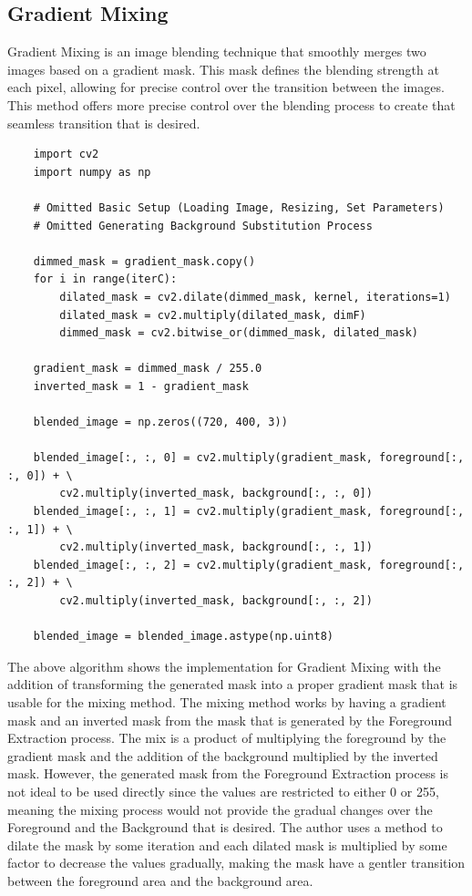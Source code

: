 \documentclass{article}
\begin{document}
\subsection{Gradient Mixing}

Gradient Mixing is an image blending technique that smoothly merges two images based on a gradient mask. This mask defines the blending strength at each pixel, allowing for precise control over the transition between the images. This method offers more precise control over the blending process to create that seamless transition that is desired.

\begin{verbatim}
    import cv2
    import numpy as np

    # Omitted Basic Setup (Loading Image, Resizing, Set Parameters)
    # Omitted Generating Background Substitution Process

    dimmed_mask = gradient_mask.copy()
    for i in range(iterC):
        dilated_mask = cv2.dilate(dimmed_mask, kernel, iterations=1)
        dilated_mask = cv2.multiply(dilated_mask, dimF)
        dimmed_mask = cv2.bitwise_or(dimmed_mask, dilated_mask)

    gradient_mask = dimmed_mask / 255.0
    inverted_mask = 1 - gradient_mask

    blended_image = np.zeros((720, 400, 3))

    blended_image[:, :, 0] = cv2.multiply(gradient_mask, foreground[:, :, 0]) + \
        cv2.multiply(inverted_mask, background[:, :, 0])
    blended_image[:, :, 1] = cv2.multiply(gradient_mask, foreground[:, :, 1]) + \
        cv2.multiply(inverted_mask, background[:, :, 1])
    blended_image[:, :, 2] = cv2.multiply(gradient_mask, foreground[:, :, 2]) + \
        cv2.multiply(inverted_mask, background[:, :, 2])

    blended_image = blended_image.astype(np.uint8)

\end{verbatim}

The above algorithm shows the implementation for Gradient Mixing with the addition of transforming the generated mask into a proper gradient mask that is usable for the mixing method. The mixing method works by having a gradient mask and an inverted mask from the mask that is generated by the Foreground Extraction process. The mix is a product of multiplying the foreground by the gradient mask and the addition of the background multiplied by the inverted mask. However, the generated mask from the Foreground Extraction process is not ideal to be used directly since the values are restricted to either 0 or 255, meaning the mixing process would not provide the gradual changes over the Foreground and the Background that is desired. The author uses a method to dilate the mask by some iteration and each dilated mask is multiplied by some factor to decrease the values gradually, making the mask have a gentler transition between the foreground area and the background area.
\end{document}

